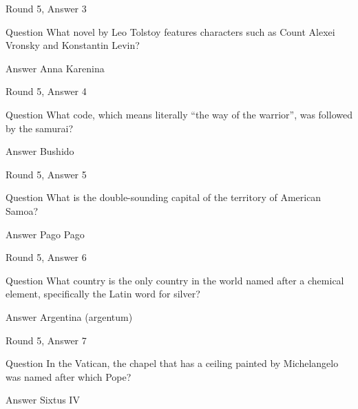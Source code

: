 \documentclass[11pt]{beamer}
\begin{document}
\begin{frame}[t]{Round 5, Answer 3}
\vspace{2em}
\begin{block}{Question}
What novel by Leo Tolstoy features characters such as Count Alexei Vronsky and Konstantin Levin\@?
\end{block}
\pause{}
\begin{block}{Answer}
Anna Karenina
\end{block}
\end{frame}
    

\begin{frame}[t]{Round 5, Answer 4}
\vspace{2em}
\begin{block}{Question}
What code, which means literally ``the way of the warrior'', was followed by the samurai\@?
\end{block}
\pause{}
\begin{block}{Answer}
Bushido
\end{block}
\end{frame}
    

\begin{frame}[t]{Round 5, Answer 5}
\vspace{2em}
\begin{block}{Question}
What is the double-sounding capital of the territory of American Samoa\@?
\end{block}
\pause{}
\begin{block}{Answer}
Pago Pago
\end{block}
\end{frame}
    

\begin{frame}[t]{Round 5, Answer 6}
\vspace{2em}
\begin{block}{Question}
What country is the only country in the world named after a chemical element, specifically the Latin word for silver\@?
\end{block}
\pause{}
\begin{block}{Answer}
Argentina (argentum)
\end{block}
\end{frame}
    

\begin{frame}[t]{Round 5, Answer 7}
\vspace{2em}
\begin{block}{Question}
In the Vatican, the chapel that has a ceiling painted by Michelangelo was named after which Pope\@?
\end{block}
\pause{}
\begin{block}{Answer}
Sixtus IV
\end{block}
\end{frame}
    
\end{document}
